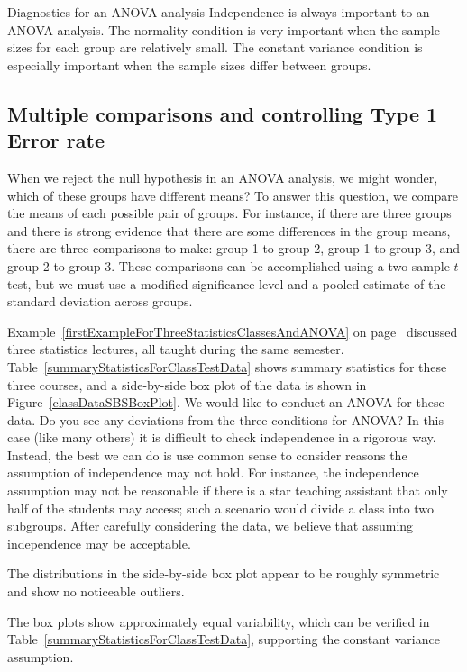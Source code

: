 \begin{caution}
{Diagnostics for an ANOVA analysis}
{Independence is always important to an ANOVA analysis. The normality condition is very important when the sample sizes for each group are relatively small. The constant variance condition is especially important when the sample sizes differ between groups.}
\end{caution}


\subsection{Multiple comparisons and controlling Type 1 Error rate}

\label{multipleComparisonsAndControllingTheType1ErrorRate}

When we reject the null hypothesis in an ANOVA analysis, we might wonder, which of these groups have different means? To answer this question, we compare the means of each possible pair of groups. For instance, if there are three groups and there is strong evidence that there are some differences in the group means, there are three comparisons to make: group 1 to group 2, group 1 to group 3, and group 2 to group 3. These comparisons can be accomplished using a two-sample $t$ test, but we must use a modified significance level and a pooled estimate of the standard deviation across groups.

\begin{example}{Example~\ref{firstExampleForThreeStatisticsClassesAndANOVA} on page~\pageref{firstExampleForThreeStatisticsClassesAndANOVA} discussed three statistics lectures, all taught during the same semester. Table~\ref{summaryStatisticsForClassTestData} shows summary statistics for these three courses, and a side-by-side box plot of the data is shown in Figure~\ref{classDataSBSBoxPlot}. We would like to conduct an ANOVA for these data. Do you see any deviations from the three conditions for ANOVA?}
In this case (like many others) it is difficult to check independence in a rigorous way. Instead, the best we can do is use common sense to consider reasons the assumption of independence may not hold. For instance, the independence assumption may not be reasonable if there is a star teaching assistant that only half of the students may access; such a scenario would divide a class into two subgroups. After carefully considering the data, we believe that assuming independence may be acceptable.

The distributions in the side-by-side box plot appear to be roughly symmetric and show no noticeable outliers.

The box plots show approximately equal variability, which can be verified in Table~\ref{summaryStatisticsForClassTestData}, supporting the constant variance assumption.
\end{example}

